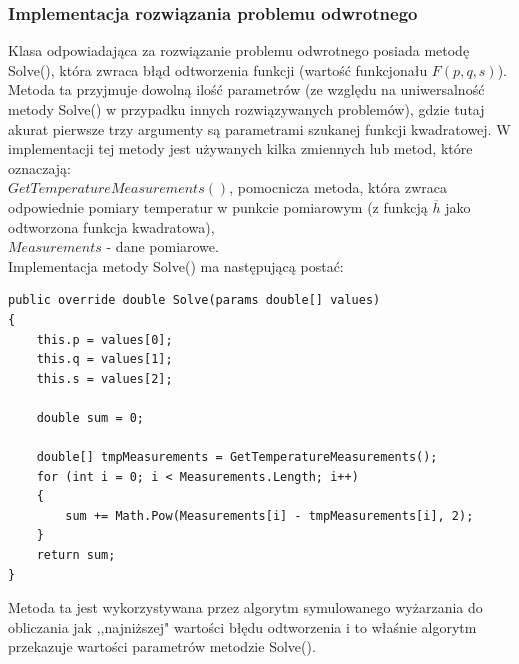 \documentclass[twoside]{projektInzynierskiMS1}
\newcommand{\si}{ś}
\begin{document}




\subsubsection{Implementacja rozwiązania problemu odwrotnego}

Klasa odpowiadająca za rozwiązanie problemu odwrotnego posiada metodę Solve(), która zwraca błąd odtworzenia funkcji (warto\si ć funkcjonału $F(p, q, s)$). Metoda ta przyjmuje dowolną ilo\si ć parametrów (ze względu na uniwersalno\si ć metody Solve() w przypadku innych rozwiązywanych problemów), gdzie tutaj akurat pierwsze trzy argumenty są parametrami szukanej funkcji kwadratowej. W implementacji tej metody jest używanych kilka zmiennych lub metod, które oznaczają:\\

\noindent $GetTemperatureMeasurements()$, pomocnicza metoda, która zwraca odpowiednie pomiary temperatur w punkcie pomiarowym (z funkcją $\overline{h}$ jako odtworzona funkcja kwadratowa), \\
\noindent $Measurements$ - dane pomiarowe. \\

Implementacja metody Solve() ma następującą postać:

\begin{verbatim}
public override double Solve(params double[] values)
{
    this.p = values[0];
    this.q = values[1];
    this.s = values[2];

    double sum = 0;

    double[] tmpMeasurements = GetTemperatureMeasurements();
    for (int i = 0; i < Measurements.Length; i++)
    {
        sum += Math.Pow(Measurements[i] - tmpMeasurements[i], 2);
    }
    return sum;
}
\end{verbatim}

Metoda ta jest wykorzystywana przez algorytm symulowanego wyżarzania do obliczania jak ,,najniższej" warto\si ci błędu odtworzenia i to wła\si nie algorytm przekazuje warto\si ci parametrów metodzie Solve().
\end{document}
